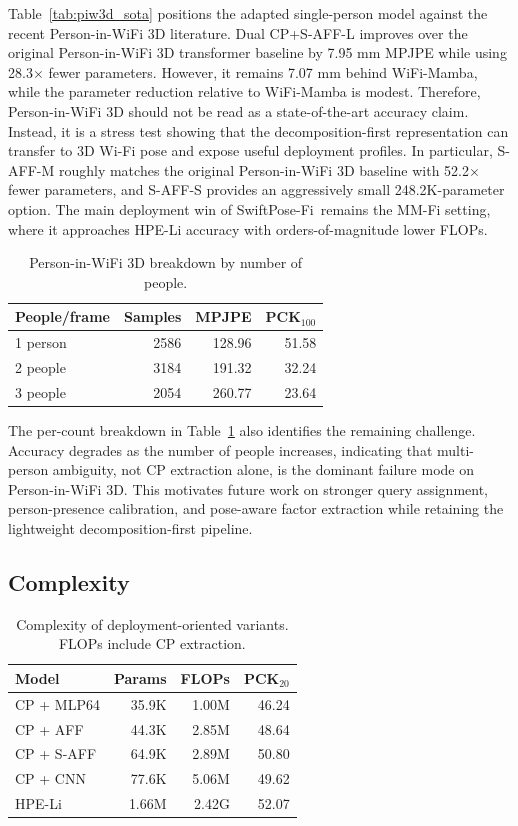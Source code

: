 \documentclass[10pt,conference]{IEEEtran}
\newcommand{\method}{SwiftPose-Fi}
\begin{document}
Table~\ref{tab:piw3d_sota} positions the adapted single-person model against the recent Person-in-WiFi 3D literature. Dual CP+S-AFF-L improves over the original Person-in-WiFi 3D transformer baseline by 7.95 mm MPJPE while using 28.3$\times$ fewer parameters. However, it remains 7.07 mm behind WiFi-Mamba, while the parameter reduction relative to WiFi-Mamba is modest. Therefore, Person-in-WiFi 3D should not be read as a state-of-the-art accuracy claim. Instead, it is a stress test showing that the decomposition-first representation can transfer to 3D Wi-Fi pose and expose useful deployment profiles. In particular, S-AFF-M roughly matches the original Person-in-WiFi 3D baseline with 52.2$\times$ fewer parameters, and S-AFF-S provides an aggressively small 248.2K-parameter option. The main deployment win of \method\ remains the MM-Fi setting, where it approaches HPE-Li accuracy with orders-of-magnitude lower FLOPs.

\begin{table}[t]
\centering
\caption{Person-in-WiFi 3D breakdown by number of people.}
\label{tab:piw3d_people}
\begin{tabular}{lrrr}
\toprule
People/frame & Samples & MPJPE & PCK$_{100}$ \\
\midrule
1 person & 2586 & 128.96 & 51.58 \\
2 people & 3184 & 191.32 & 32.24 \\
3 people & 2054 & 260.77 & 23.64 \\
\bottomrule
\end{tabular}
\end{table}

The per-count breakdown in Table~\ref{tab:piw3d_people} also identifies the remaining challenge. Accuracy degrades as the number of people increases, indicating that multi-person ambiguity, not CP extraction alone, is the dominant failure mode on Person-in-WiFi 3D. This motivates future work on stronger query assignment, person-presence calibration, and pose-aware factor extraction while retaining the lightweight decomposition-first pipeline.

\subsection{Complexity}

\begin{table}[t]
\centering
\caption{Complexity of deployment-oriented variants. FLOPs include CP extraction.}
\label{tab:complexity}
\begin{tabular}{lrrr}
\toprule
Model & Params & FLOPs & PCK$_{20}$ \\
\midrule
CP + MLP64 & 35.9K & 1.00M & 46.24 \\
CP + AFF & 44.3K & 2.85M & 48.64 \\
CP + S-AFF & 64.9K & 2.89M & 50.80 \\
CP + CNN & 77.6K & 5.06M & 49.62 \\
HPE-Li & 1.66M & 2.42G & 52.07 \\
\bottomrule
\end{tabular}
\end{table}
\end{document}
